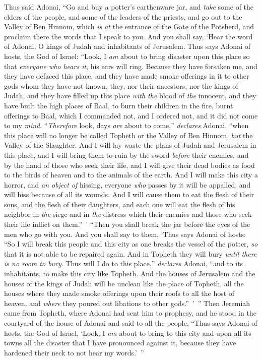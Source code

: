 \begin{biblechapter} %
 Thus said Adonai, “Go and buy a potter’s earthenware jar, and \textit{take} some of the elders of the people, and some of the leaders of the priests,
\verse and go out to the Valley of Ben Hinnom, which \textit{is at} the entrance of the Gate of the Potsherd, and proclaim there the words that I speak to you.
\verse And you shall say, ‘Hear the word of Adonai, O kings of Judah and inhabitants of Jerusalem. Thus says Adonai of hosts, the God of Israel: “Look, I \textit{am} about to bring disaster upon this place so that \textit{everyone who hears it}, his ears will ring.
\verse Because they have forsaken me, and they have defaced this place, and they have made smoke offerings in it to other gods whom they have not known, they, nor their ancestors, nor the kings of Judah, and they have filled up this place \textit{with the} blood of \textit{the} innocent,
\verse and they have built the high places of Baal, to burn their children in the fire, burnt offerings to Baal, which I commanded not, and I ordered not, and it did not come to my \textit{mind}.
\verse “\textit{Therefore} look, days \textit{are} about to come,” \textit{declares} Adonai, “when this place will no longer be called Topheth or the Valley of Ben Hinnom, \textit{but} the Valley of the Slaughter.
\verse And I will lay waste the plans of Judah and Jerusalem in this place, and I will bring them to ruin by the sword \textit{before} their enemies, and by the hand of those who seek their life, and I will give their dead bodies as food to the birds of heaven and to the animals of the earth.
\verse And I will make this city a horror, and \textit{an object of} hissing, everyone \textit{who} passes by it will be appalled, and will hiss because of all its wounds.
\verse And I will cause them to eat the flesh of their sons, and the flesh of their daughters, and each one will eat the flesh of his neighbor in \textit{the} siege and in \textit{the} distress which their enemies and those who seek their life inflict on them.” ’
\verse “Then you shall break the jar before the eyes of the men who go with you.
\verse And you shall say to them, ‘Thus says Adonai of hosts: “So I will break this people and this city as one breaks the vessel of the potter, \textit{so} that it is not able to be repaired again. And in Topheth they will bury \textit{until there is no room to bury}.
\verse Thus will I do to this place,” \textit{declares} Adonai, “and to its inhabitants, to make this city like Topheth.
\verse And the houses of Jerusalem and the houses of the kings of Judah will be unclean like the place of Topheth, all the houses where they made smoke offerings upon their roofs to all the host of heaven, and \textit{where} they poured out libations to other gods.” ’ ”
\verse Then Jeremiah came from Topheth, where Adonai had sent him to prophesy, and he stood in the courtyard of the house of Adonai and said to all the people,
\verse “Thus says Adonai of hosts, the God of Israel, ‘Look, I \textit{am} about to bring to this city and upon all its towns all the disaster that I have pronounced against it, because they have hardened their neck to not hear my words.’ ”
\end{biblechapter}

